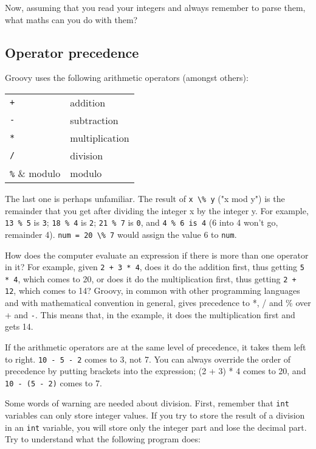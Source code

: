 Now, assuming that you read your integers and always remember to parse
them, what maths can you do with them?

\subsection{Operator precedence}
\label{sec:prec}

Groovy uses the following arithmetic operators (amongst others):

\begin{tabular}{ll}
\verb!+! & addition\\
\verb!-! & subtraction\\
\verb!*! & multiplication\\
\verb!/! & division\\
\verb!%! & modulo\\
\end{tabular}

The last one is perhaps unfamiliar.  The result of \verb!x \% y! ("x mod y")
is the remainder that you get after dividing the integer x by the integer y.
For example, \verb!13 % 5! is \verb!3!; \verb!18 % 4! is \verb!2!; 
\verb!21 % 7! is \verb!0!, and \verb!4 % 6 is 4! (6 into 4 won't go, 
remainder 4).  \verb!num = 20 \% 7! would assign the value 6
to \verb!num!.

How does the computer evaluate an expression if there is more than one
operator in it? For example, given \verb!2 + 3 * 4!, does it do the
addition first, thus getting \verb!5 * 4!, which comes to 20, or does
it do the multiplication first, thus getting \verb!2 + 12!, which
comes to 14?  Groovy, in common with other programming languages and
with mathematical convention in general, gives precedence to *, / and
\% over + and \verb!-!.  This means that, in the example, it does the
multiplication first and gets 14.

If the arithmetic operators are at the same level of precedence, it
takes them left to right.  \verb!10 - 5 - 2! comes to 3, not 7.  You
can always override the order of precedence by putting brackets into
the expression; (2 + 3) * 4 comes to 20, and \verb!10 - (5 - 2)! comes
to 7.

Some words of warning are needed about division. First, remember that
\verb-int- variables can only store integer values. If you try to
store the result of a division in an \verb-int- variable, you will
store only the integer part and lose the decimal part. Try to
understand what the following program does:

